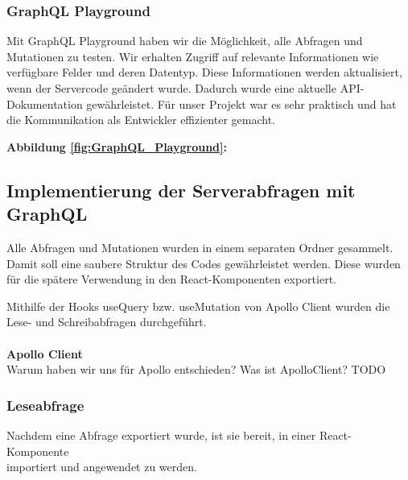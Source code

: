 \subsubsection{GraphQL Playground}
Mit GraphQL Playground haben wir die Möglichkeit, alle Abfragen und Mutationen zu testen. Wir erhalten Zugriff auf relevante Informationen wie verfügbare Felder und deren Datentyp. Diese Informationen werden aktualisiert, wenn der Servercode geändert wurde. Dadurch wurde eine aktuelle API-Dokumentation gewährleistet. Für unser Projekt war es sehr praktisch und hat die Kommunikation als Entwickler effizienter gemacht.
\\
\begin{center}
\end{center}
\textbf{Abbildung \autoref{fig:GraphQL_Playground}:}
\newpage

\subsection{Implementierung der Serverabfragen mit GraphQL}
Alle Abfragen und Mutationen wurden in einem separaten Ordner gesammelt.
Damit soll eine saubere Struktur des Codes gewährleistet werden.
Diese wurden für die spätere Verwendung in den React-Komponenten exportiert.

Mithilfe der Hooks useQuery bzw. useMutation von Apollo Client wurden die Lese- und Schreibabfragen durchgeführt.
\\\\
\textbf{Apollo Client}\\
Warum haben wir uns für Apollo entschieden? Was ist ApolloClient?
TODO
\newpage

\subsubsection{Leseabfrage}
Nachdem eine Abfrage exportiert wurde, ist sie bereit, in einer React-Komponente \\
importiert und angewendet zu werden.

